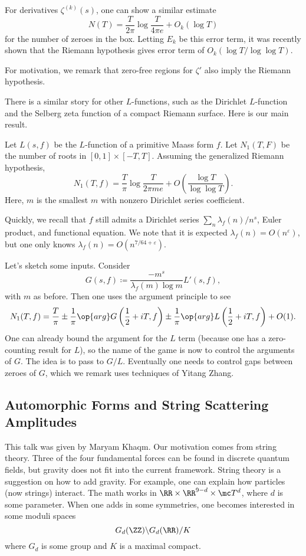 \documentclass{article}
\begin{document}
For derivatives $\zeta^{(k)}(s)$, one can show a similar estimate
\[N(T)=\frac T{2\pi}\log\frac T{4\pi e}+O_k(\log T)\]
for the number of zeroes in the box. Letting $E_k$ be this error term, it was recently shown that the Riemann hypothesis gives error term of $O_k(\log T/\log\log T)$.
\begin{remark}
	For motivation, we remark that zero-free regions for $\zeta'$ also imply the Riemann hypothesis.
\end{remark}
There is a similar story for other $L$-functions, such as the Dirichlet $L$-function and the Selberg zeta function of a compact Riemann surface. Here is our main result.
\begin{theorem}
	Let $L(s,f)$ be the $L$-function of a primitive Maass form $f$. Let $N_1(T,F)$ be the number of roots in $[0,1]\times[-T,T]$. Assuming the generalized Riemann hypothesis,
	\[N_1(T,f)=\frac T\pi\log\frac T{2\pi me}+O\left(\frac{\log T}{\log\log T}\right).\]
	Here, $m$ is the smallest $m$ with nonzero Dirichlet series coefficient.
\end{theorem}
Quickly, we recall that $f$ still admits a Dirichlet series $\sum_n\lambda_f(n)/n^s$, Euler product, and functional equation. We note that it is expected $\lambda_f(n)=O(n^\varepsilon)$, but one only knows $\lambda_f(n)=O\left(n^{7/64+\varepsilon}\right)$.

Let's sketch some inputs. Consider
\[G(s,f)\coloneqq\frac{-m^s}{\lambda_f(m)\log m}L'(s,f),\]
with $m$ as before. Then one uses the argument principle to see
\[N_1(T,f)=\frac T\pi\pm\frac1\pi\op{arg}G\left(\frac12+iT,f\right)\pm\frac1\pi\op{arg}L\left(\frac12+iT,f\right)+O(1).\]
One can already bound the argument for the $L$ term (because one has a zero-counting result for $L$), so the name of the game is now to control the arguments of $G$. The idea is to pass to $G/L$. Eventually one needs to control gaps between zeroes of $G$, which we remark uses techniques of Yitang Zhang.

\subsection{Automorphic Forms and String Scattering Amplitudes}
This talk was given by Maryam Khaqm. Our motivation comes from string theory. Three of the four fundamental forces can be found in discrete quantum fields, but gravity does not fit into the current framework. String theory is a suggestion on how to add gravity. For example, one can explain how particles (now strings) interact. The math works in $\RR\times\RR^{9-d}\times\mc T^d$, where $d$ is some parameter. When one adds in some symmetries, one becomes interested in some moduli spaces
\[G_d(\ZZ)\backslash G_d(\RR)/K\]
where $G_d$ is some group and $K$ is a maximal compact.
\end{document}
